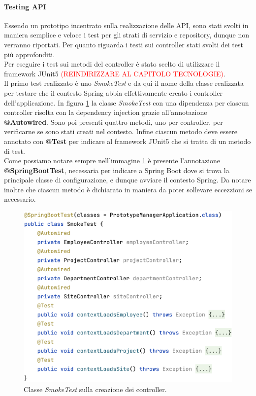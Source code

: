 \paragraph{Testing API}
Essendo un prototipo incentrato sulla realizzazione delle API, sono stati svolti in maniera semplice e veloce i test per gli strati di servizio e repository, dunque non verranno riportati. Per quanto riguarda i testi sui controller stati svolti dei test più approfonditi.\\
Per eseguire i test sui metodi del controller è stato scelto di utilizzare il framework JUnit5 \textcolor{red}{(REINDIRIZZARE AL CAPITOLO TECNOLOGIE)}.\\
Il primo test realizzato è uno \textit{SmokeTest} e da qui il nome della classe realizzata per testare che il contesto Spring abbia effettivamente creato i controller dell'applicazione. In figura \ref{smoke-test} la classe \textit{SmokeTest} con una dipendenza per ciascun controller risolta con la dependency injection grazie all'annotazione \textbf{@Autowired}. Sono poi presenti quattro metodi, uno per controller, per verificarne se sono stati creati nel contesto. Infine ciascun metodo deve essere annotato con \textbf{@Test} per indicare al framework JUnit5 che si tratta di un metodo di test.\\
Come possiamo notare sempre nell'immagine \ref{smoke-test} è presente l'annotazione \textbf{@SpringBootTest}, necessaria per indicare a Spring Boot dove si trova la principale classe di configurazione, e dunque avviare il contesto Spring. Da notare inoltre che ciascun metodo è dichiarato in maniera da poter sollevare eccezzioni se necessario.
\FloatBarrier
\begin{figure}[!ht]
\begin{mdframed}
\centering
\includegraphics[width=0.7\linewidth]{immagini/SmokeTest.png}
\end{mdframed}
\caption{Classe \textit{SmokeTest} sulla creazione dei controller.}
\label{smoke-test}
\end{figure}
